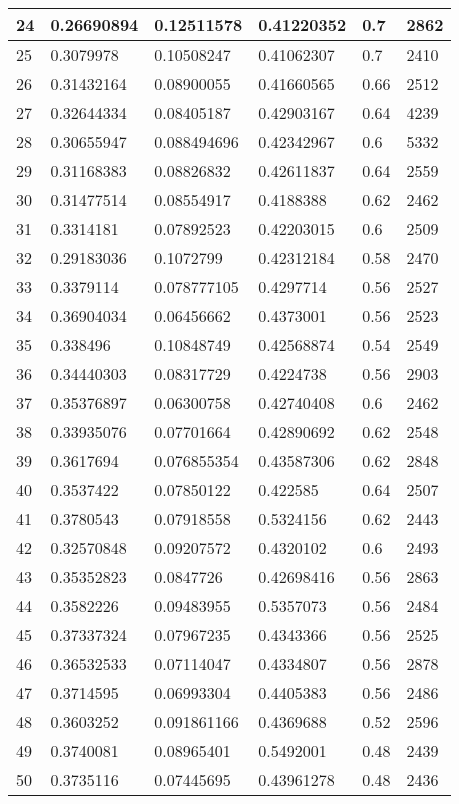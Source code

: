 \begin{longtable}{|l|l|l|l|l|l|}
24 & 0.26690894 & 0.12511578 & 0.41220352 & 0.7 & 2862 \\ \hline 
25 & 0.3079978 & 0.10508247 & 0.41062307 & 0.7 & 2410 \\ \hline 
26 & 0.31432164 & 0.08900055 & 0.41660565 & 0.66 & 2512 \\ \hline 
27 & 0.32644334 & 0.08405187 & 0.42903167 & 0.64 & 4239 \\ \hline 
28 & 0.30655947 & 0.088494696 & 0.42342967 & 0.6 & 5332 \\ \hline 
29 & 0.31168383 & 0.08826832 & 0.42611837 & 0.64 & 2559 \\ \hline 
30 & 0.31477514 & 0.08554917 & 0.4188388 & 0.62 & 2462 \\ \hline 
31 & 0.3314181 & 0.07892523 & 0.42203015 & 0.6 & 2509 \\ \hline 
32 & 0.29183036 & 0.1072799 & 0.42312184 & 0.58 & 2470 \\ \hline 
33 & 0.3379114 & 0.078777105 & 0.4297714 & 0.56 & 2527 \\ \hline 
34 & 0.36904034 & 0.06456662 & 0.4373001 & 0.56 & 2523 \\ \hline 
35 & 0.338496 & 0.10848749 & 0.42568874 & 0.54 & 2549 \\ \hline 
36 & 0.34440303 & 0.08317729 & 0.4224738 & 0.56 & 2903 \\ \hline 
37 & 0.35376897 & 0.06300758 & 0.42740408 & 0.6 & 2462 \\ \hline 
38 & 0.33935076 & 0.07701664 & 0.42890692 & 0.62 & 2548 \\ \hline 
39 & 0.3617694 & 0.076855354 & 0.43587306 & 0.62 & 2848 \\ \hline 
40 & 0.3537422 & 0.07850122 & 0.422585 & 0.64 & 2507 \\ \hline 
41 & 0.3780543 & 0.07918558 & 0.5324156 & 0.62 & 2443 \\ \hline 
42 & 0.32570848 & 0.09207572 & 0.4320102 & 0.6 & 2493 \\ \hline 
43 & 0.35352823 & 0.0847726 & 0.42698416 & 0.56 & 2863 \\ \hline 
44 & 0.3582226 & 0.09483955 & 0.5357073 & 0.56 & 2484 \\ \hline 
45 & 0.37337324 & 0.07967235 & 0.4343366 & 0.56 & 2525 \\ \hline 
46 & 0.36532533 & 0.07114047 & 0.4334807 & 0.56 & 2878 \\ \hline 
47 & 0.3714595 & 0.06993304 & 0.4405383 & 0.56 & 2486 \\ \hline 
48 & 0.3603252 & 0.091861166 & 0.4369688 & 0.52 & 2596 \\ \hline 
49 & 0.3740081 & 0.08965401 & 0.5492001 & 0.48 & 2439 \\ \hline 
50 & 0.3735116 & 0.07445695 & 0.43961278 & 0.48 & 2436 \\ \hline 
\end{longtable}